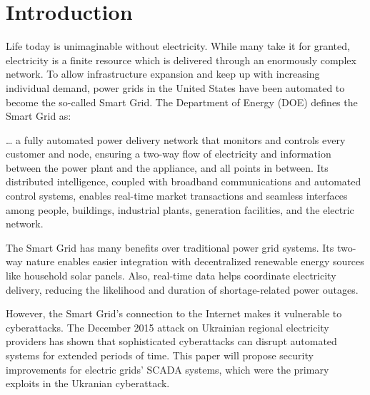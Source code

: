 \documentclass[10pt]{article}
\begin{document}
    
    \section{Introduction}
    
    Life today is unimaginable without electricity. While many take it for granted, electricity is a finite resource which is delivered through an enormously complex network. To allow infrastructure expansion and keep up with increasing individual demand, power grids in the United States have been automated to become the so-called Smart Grid. The Department of Energy (DOE) defines the Smart Grid as:
    \begin{displayquote}
    … a fully automated power delivery network that monitors and controls every customer and node, ensuring a two-way flow of electricity and information between the power plant and the appliance, and all points in between. Its distributed intelligence, coupled with broadband communications and automated control systems, enables real-time market transactions and seamless interfaces among people, buildings, industrial plants, generation facilities, and the electric network.\cite{campbell3}
    \end{displayquote}
    
    The Smart Grid has many benefits over traditional power grid systems. Its two-way nature enables easier integration with decentralized renewable energy sources like household solar panels.\cite{knapp7} Also, real-time data helps coordinate electricity delivery, reducing the likelihood and duration of shortage-related power outages.\cite{knapp11}
    \medskip
    
    However, the Smart Grid's connection to the Internet makes it vulnerable to cyberattacks. The December 2015 attack on Ukrainian regional electricity providers has shown that sophisticated cyberattacks can disrupt automated systems for extended periods of time.\cite{wired} This paper will propose security improvements for electric grids' SCADA systems, which were the primary exploits in the Ukranian cyberattack.
    \medskip
    
\end{document}
